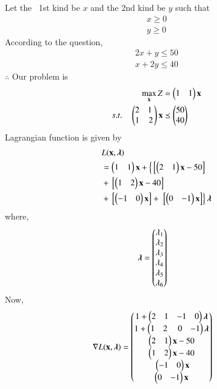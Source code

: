 
\begin{table}[!ht]
\centering
{}
\caption{Ingredients used in making the cake is flour and fat }
\label{opt/13/tab:table1}
\end{table}
Let the  1st kind  be $x$ and the 2nd kind be $y$  such that 
\begin{align}
x \geq 0 \\
y \geq 0 
\end{align}
According to the question,
\begin{align}
2{x} + {y} \leq 50
\\
{x} + 2{y} \leq 40
\end{align}
$\therefore$ Our problem is
\begin{align}
\max_{\vec{x}} Z &= \myvec{1& 1}\vec{x}\\
s.t. \quad \myvec{2 & 1 \\ 1& 2}\vec{x} &\preceq \myvec{50\\40} 
\end{align}
Lagrangian function is given by
\begin{equation}
\begin{aligned}
&L(\mathbf{x},\boldsymbol{\lambda}) \\ &= \begin{pmatrix}1 & 1\end{pmatrix}\mathbf{x}+\left\{{}\left[\begin{pmatrix}2 & 1\end{pmatrix}\mathbf{x}-50\right]\right. \\ &+ {}\left[\begin{pmatrix}1 & 2\end{pmatrix}\mathbf{x}-40\right]\\ &+ {}\left[\begin{pmatrix}-1 & 0\end{pmatrix}\mathbf{x}\right] +\left.{}\left[\begin{pmatrix}0 & -1\end{pmatrix}\mathbf{x}\right]\right\}\boldsymbol{\lambda}
\end{aligned}
\end{equation}
where,
\begin{align}
\boldsymbol{\lambda} &= \begin{pmatrix}\lambda_1 \\ \lambda_2 \\ \lambda_3 \\ \lambda_4 \\ \lambda_5 \\ \lambda_6\end{pmatrix}
\end{align}
Now,
\begin{align}
\nabla L(\vec{x},\boldsymbol{\lambda}) &= \myvec{1+ \myvec{2 & 1 & -1 & 0 }\boldsymbol{\lambda}\\ 1+\myvec{1 & 2 & 0 & -1}\boldsymbol{\lambda} \\ \myvec{2 & 1}\vec{x}-50\\ \myvec{1& 2}\vec{x}-40 \\  \myvec{-1 & 0}\vec{x} \\ \myvec{0 & -1}\vec{x}}
\end{align}
